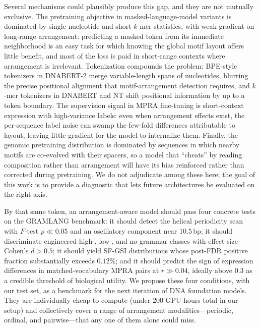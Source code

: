 \documentclass{article}
\begin{document}
Several mechanisms could plausibly produce this gap, and they are not mutually exclusive. The pretraining objective in masked-language-model variants is dominated by single-nucleotide and short-$k$-mer statistics, with weak gradient on long-range arrangement: predicting a masked token from its immediate neighborhood is an easy task for which knowing the global motif layout offers little benefit, and most of the loss is paid in short-range contexts where arrangement is irrelevant. Tokenization compounds the problem: BPE-style tokenizers in DNABERT-2 merge variable-length spans of nucleotides, blurring the precise positional alignment that motif-arrangement detection requires, and $k$-mer tokenizers in DNABERT and NT shift positional information by up to a token boundary. The supervision signal in MPRA fine-tuning is short-context expression with high-variance labels: even when arrangement effects exist, the per-sequence label noise can swamp the few-fold differences attributable to layout, leaving little gradient for the model to internalize them. Finally, the genomic pretraining distribution is dominated by sequences in which nearby motifs are co-evolved with their spacers, so a model that ``cheats'' by reading composition rather than arrangement will have its bias reinforced rather than corrected during pretraining. We do not adjudicate among these here; the goal of this work is to provide a diagnostic that lets future architectures be evaluated on the right axis.

By that same token, an arrangement-aware model should pass four concrete tests on the GRAMLANG benchmark: it should detect the helical periodicity scan with $F$-test $p \ll 0.05$ and an oscillatory component near $10.5$\,bp; it should discriminate engineered high-, low-, and no-grammar classes with effect size Cohen's $d > 0.5$; it should yield SF-GSI distributions whose post-FDR positive fraction substantially exceeds $0.12\%$; and it should predict the sign of expression differences in matched-vocabulary MPRA pairs at $r \gg 0.04$, ideally above $0.3$ as a credible threshold of biological utility. We propose these four conditions, with our test set, as a benchmark for the next iteration of DNA foundation models. They are individually cheap to compute (under $200$ GPU-hours total in our setup) and collectively cover a range of arrangement modalities---periodic, ordinal, and pairwise---that any one of them alone could miss.
\end{document}

